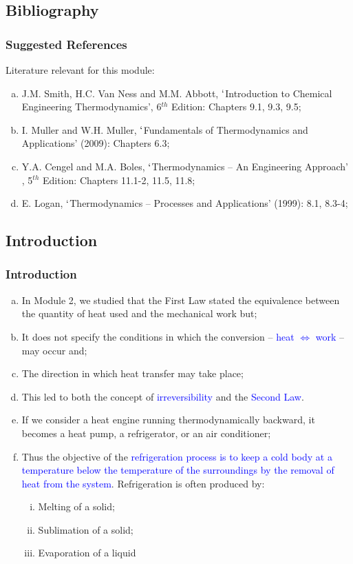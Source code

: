 \documentclass[10pt,compress]{beamer}
\begin{document}
\subsection{Bibliography} 
\begin{frame}
 \frametitle{Suggested References}
  Literature relevant for this module:
  \begin{enumerate}[(a)]
   \item J.M. Smith, H.C. Van Ness and M.M. Abbott, $\lq$Introduction to Chemical Engineering Thermodynamics', 6$^{th}$ Edition: Chapters 9.1, 9.3, 9.5;
   \item I. Muller and W.H. Muller, $\lq$Fundamentals of Thermodynamics and Applications' (2009): Chapters 6.3;
   \item Y.A. Cengel and M.A. Boles, $\lq$Thermodynamics -- An Engineering Approach' , 5$^{th}$ Edition: Chapters 11.1-2, 11.5, 11.8;
   \item E. Logan, $\lq$Thermodynamics -- Processes and Applications' (1999): 8.1, 8.3-4;
  \end{enumerate}
\end{frame}


\subsection{Introduction} 
\begin{frame}
 \frametitle{Introduction}
  \begin{enumerate}[(a)]
   \item <1-> In Module 2, we studied that the First Law stated the equivalence between the quantity of heat used and the mechanical work but;
   \item <2-> It does not specify the conditions in which the conversion -- \textcolor{blue}{heat $\Leftrightarrow$ work} -- may occur and;
   \item <3-> The direction in which heat transfer may take place;
   \item <4-> This led to both the concept of \textcolor{blue}{irreversibility} and the \textcolor{blue}{Second Law}.
   \item <5-> If we consider a heat engine running thermodynamically backward, it becomes a heat pump, a refrigerator, or an air conditioner;
   \item <6-> Thus the objective of the \textcolor{blue}{refrigeration process is to keep a cold body at a temperature below the temperature of the surroundings by the removal of heat from the system}. Refrigeration is often produced by:
       \begin{enumerate}[(i)]
         \item <7-> Melting of a solid;
         \item <8-> Sublimation of a solid;
         \item <9-> Evaporation of a liquid
     \end{enumerate}  
  \end{enumerate}
\end{frame}
\end{document}
